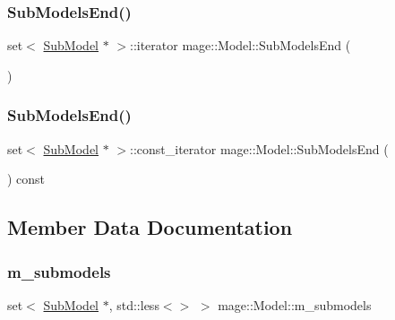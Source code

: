 \hypertarget{classmage_1_1_model_a44e7b26f9852046aa96dc41c01222a04}{}\label{classmage_1_1_model_a44e7b26f9852046aa96dc41c01222a04} 
\subsubsection{\texorpdfstring{Sub\+Models\+End()}{SubModelsEnd()}\hspace{0.1cm}{\footnotesize\ttfamily [1/2]}}
{\footnotesize\ttfamily set$<$ \hyperlink{classmage_1_1_sub_model}{Sub\+Model} $\ast$ $>$\+::iterator mage\+::\+Model\+::\+Sub\+Models\+End (\begin{DoxyParamCaption}{ }\end{DoxyParamCaption})}

\hypertarget{classmage_1_1_model_a855e215577321ff6e226c624d7bd7e39}{}\label{classmage_1_1_model_a855e215577321ff6e226c624d7bd7e39} 
\subsubsection{\texorpdfstring{Sub\+Models\+End()}{SubModelsEnd()}\hspace{0.1cm}{\footnotesize\ttfamily [2/2]}}
{\footnotesize\ttfamily set$<$ \hyperlink{classmage_1_1_sub_model}{Sub\+Model} $\ast$ $>$\+::const\+\_\+iterator mage\+::\+Model\+::\+Sub\+Models\+End (\begin{DoxyParamCaption}{ }\end{DoxyParamCaption}) const}



\subsection{Member Data Documentation}
\hypertarget{classmage_1_1_model_a86c68c03650c206afa9c0a0b09a849e3}{}\label{classmage_1_1_model_a86c68c03650c206afa9c0a0b09a849e3} 
\subsubsection{\texorpdfstring{m\+\_\+submodels}{m\_submodels}}
{\footnotesize\ttfamily set$<$ \hyperlink{classmage_1_1_sub_model}{Sub\+Model} $\ast$, std\+::less$<$$>$ $>$ mage\+::\+Model\+::m\+\_\+submodels\hspace{0.3cm}{\ttfamily [private]}}

